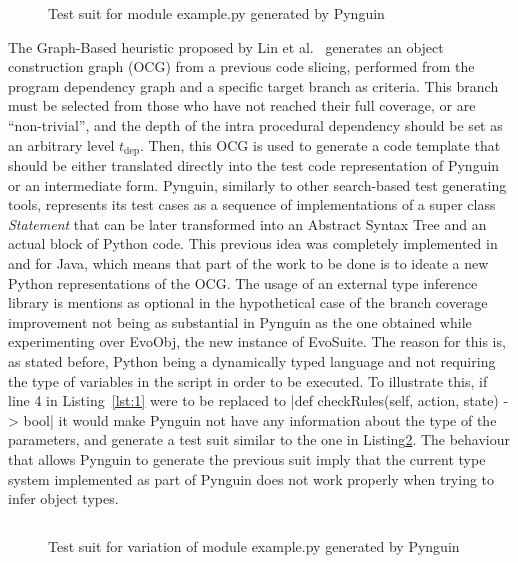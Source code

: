 \documentclass[%
  chapterprefix=false,%
  open=right,%
  twoside=true,%
  paper=a4,%
  logofile={Figures/logo.png},%
  thesistype=master,%
  UKenglish,%
]{se2thesis}
\begin{document}
\begin{figure}
    \inputminted[linenos]{python}{Figures/test1.py}
    \caption{Test suit for module example.py generated by Pynguin\label{lst:3}}
\end{figure}

The Graph-Based heuristic proposed by Lin et al.~\cite{DBLP:conf/sigsoft/0001O00D21} generates an object construction graph (OCG) from a previous code slicing, performed from the program dependency graph and a specific target branch as criteria.
This branch must be selected from those who have not reached their full coverage, or are ``non-trivial'', and the depth of the intra procedural dependency should be set as an arbitrary level $t_{\text{dep}}$.
Then, this OCG is used to generate a code template that should be either translated directly into the test code representation of Pynguin or an intermediate form.
Pynguin, similarly to other search-based test generating tools, represents its test cases as a sequence of implementations of a super class \textit{Statement} that can be later transformed into an Abstract Syntax Tree and an actual block of Python code.
This previous idea was completely implemented in and for Java, which means that part of the work to be done is to ideate a new Python representations of the OCG.\@
The usage of an external type inference library is mentions as optional in the hypothetical case of the branch coverage improvement not being as substantial in Pynguin as the one obtained while experimenting over EvoObj, the new instance of EvoSuite.
The reason for this is, as stated before, Python being a dynamically typed language and not requiring the type of variables in the script in order to be executed.
To illustrate this, if line 4 in Listing~\ref{lst:1} were to be replaced to |def checkRules(self, action, state) -> bool| it would make Pynguin not have any information about the type of the parameters, and generate a test suit similar to the one in Listing\ref{lst:4}.
The behaviour that allows Pynguin to generate the previous suit imply that the current type system implemented as part of Pynguin does not work properly when trying to infer object types.

\begin{figure}
  \inputminted[linenos]{python}{Figures/test2.py}
  \caption{Test suit for variation of module example.py generated by Pynguin\label{lst:4}}
\end{figure}
\end{document}
